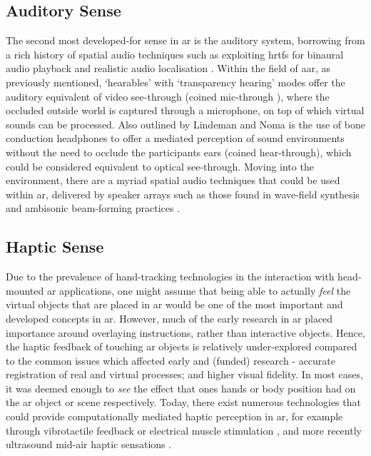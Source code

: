 \subsection{Auditory Sense}\label{sec: ar-sensory-auditory}
The second most developed-for sense in \gls{ar} is the auditory system, borrowing from a rich history of spatial audio techniques such as exploiting \glspl{hrtf} for binaural audio playback and realistic audio localisation \citep{blauert1969,blauert1996}. Within the field of \gls{aar}, as previously mentioned, `hearables' with `transparency hearing' modes offer the auditory equivalent of video see-through (coined mic-through \citep{lindeman2008}), where the occluded outside world is captured through a microphone, on top of which virtual sounds can be processed. Also outlined by Lindeman and Noma is the use of bone conduction headphones to offer a mediated perception of sound environments without the need to occlude the participants ears (coined hear-through), which could be considered equivalent to optical see-through. Moving into the environment, there are a myriad spatial audio techniques that could be used within \gls{ar}, delivered by speaker arrays such as those found in wave-field synthesis \citep{berkhout1993} and ambisonic beam-forming practices \citep{sharma2018,mcarthur2019}.

\subsection{Haptic Sense}\label{sec: ar-sensory-haptic}
Due to the prevalence of hand-tracking technologies in the interaction with head-mounted \gls{ar} applications, one might assume that being able to actually \textit{feel} the virtual objects that are placed in \gls{ar} would be one of the most important and developed concepts in \gls{ar}. However, much of the early research in \gls{ar} placed importance around overlaying instructions, rather than interactive objects. Hence, the haptic feedback of touching \gls{ar} objects is relatively under-explored compared to the common issues which affected early and (funded) research - accurate registration of real and virtual processes; and higher visual fidelity. In most cases, it was deemed enough to \textit{see} the effect that ones hands or body position had on the \gls{ar} object or scene respectively. Today, there exist numerous technologies that could provide computationally mediated haptic perception in \gls{ar}, for example through vibrotactile feedback or electrical muscle stimulation \citep{lopes2018}, and more recently ultrasound mid-air haptic sensations \cite{ablart2019}.

